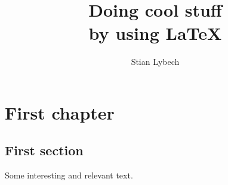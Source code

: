 \documentclass[a4paper,oneside,11pt,final]{memoir}
\title{Doing cool stuff\\by using \LaTeX}
\author{Stian Lybech}
\begin{document}
\begin{titlingpage}
\maketitle 
\end{titlingpage}

\chapter{First chapter}
\section{First section}
Some interesting and relevant text.
\end{document}
